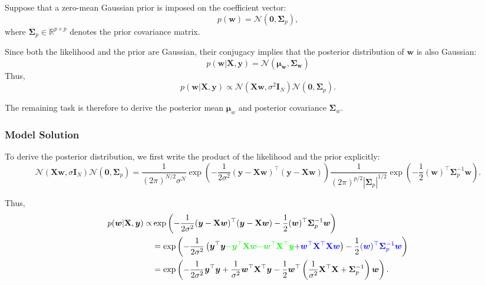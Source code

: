 \documentclass[../Bayesian_Inference.tex]{subfiles}
\begin{document}
Suppose that a zero-mean Gaussian prior is imposed on the coefficient vector:
\[
    p(\bm{w}) = \mathcal{N}\left(\bm{0}, \mathbf{\Sigma}_{p}\right),
\]
where $\mathbf{\Sigma}_p\in\mathbb{R}^{p\times p}$ denotes the prior covariance matrix.

Since both the likelihood and the prior are Gaussian, their conjugacy implies that the posterior distribution of $\bm{w}$ is also Gaussian:
\[
    p(\bm{w} | \mathbf{X}, \bm{y}) = \mathcal{N}(\bm{\mu}_{\bm{w}}, \mathbf{\Sigma}_{\bm{w}})
\]
Thus,
\[
    p(\bm{w} | \mathbf{X}, \bm{y}) \propto \mathcal{N}(\mathbf{X}\bm{w}, \sigma^2 \mathbf{I}_N) \mathcal{N}\left(\bm{0}, \mathbf{\Sigma}_{p}\right).
\]

The remaining task is therefore to derive the posterior mean $\bm{\mu}_w$ and posterior covariance $\mathbf{\Sigma}_w$.

\subsubsection{Model Solution}

To derive the posterior distribution, we first write the product of the likelihood and the prior explicitly:
\[
    \mathcal{N}(\mathbf{X}\bm{w}, \sigma \mathbf{I}_N) \mathcal{N}\left(\bm{0}, \mathbf{\Sigma}_{p}\right) = 
    \frac{1}{(2\pi)^{N/2} \sigma^{N}}\exp\left(-\frac{1}{2\sigma^{2}}  (\bm{y} - \mathbf{X}\bm{w})^{\top} (\bm{y} - \mathbf{X}\bm{w}) \right) \frac{1}{(2\pi)^{p/2} |\mathbf{\Sigma}_{p}|^{1/2}}\exp\left(-\frac{1}{2} (\bm{w})^{\top} \mathbf{\Sigma}_{p}^{-1} \bm{w} \right).
\]

Thus, 
\[
\begin{aligned}
    p(\bm{w} | \mathbf{X}, \bm{y}) \propto & \exp\left(-\frac{1}{2\sigma^{2}}  (\bm{y} - \mathbf{X}\bm{w})^{\top} (\bm{y} - \mathbf{X}\bm{w}) -\frac{1}{2} (\bm{w})^{\top} \mathbf{\Sigma}_{p}^{-1} \bm{w}\right) \\
    & = \exp\left(-\frac{1}{2\sigma^{2}} \left(\bm{y}^{\top} \bm{y} \textcolor{green}{- \bm{y}^{\top} \mathbf{X}\bm{w}} \textcolor{green}{- \bm{w}^{\top} \mathbf{X}^{\top} \bm{y}} \textcolor{blue}{+ \bm{w}^{\top} \mathbf{X}^{\top} \mathbf{X} \bm{w}}\right) - \frac{1}{2} \textcolor{blue}{(\bm{w})^{\top} \mathbf{\Sigma}_{p}^{-1} \bm{w}} \right) \\
    & = \exp\left( -\frac{1}{2\sigma^{2}} \bm{y}^{\top} \bm{y} + \frac{1}{\sigma^{2}} \bm{w}^{\top} \mathbf{X}^{\top} \bm{y} - \frac{1}{2} \bm{w}^{\top} \left(\frac{1}{\sigma^{2}} \mathbf{X}^{\top} \mathbf{X} + \mathbf{\Sigma}_{p}^{-1}\right) \bm{w} \right).
\end{aligned}
\]
\end{document}
